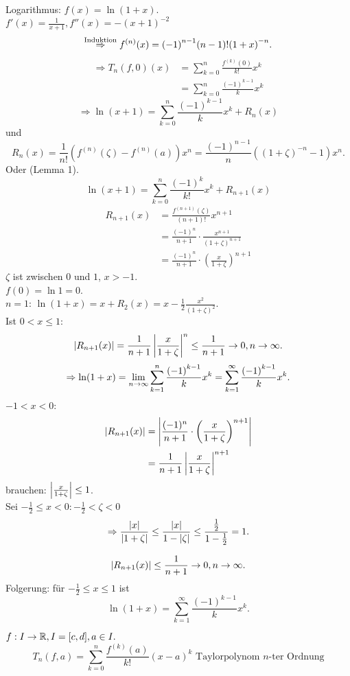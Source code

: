 \documentclass[../ana2.tex]{subfiles}
\begin{document}
\begin{bsp}
    Logarithmus: \( f(x) = \ln(1+x) \). \\
    \( f'(x) = \frac{1}{x+1}, f''(x) = -(x+1)^{-2} \)
    \[ \overset{\text{Induktion}}{\Rightarrow} f^{(n)}(x) 
    = {(-1)}^{n-1} (n-1)! {(1+x)}^{-n}. \]
    \begin{align*}
        \Rightarrow T_n(f,0)(x) &= \sum_{k=0}^{n} \frac{f^{(k)}(0)}{k!}x^k \\
        &= \sum_{k=0}^n \frac{{(-1)}^{k-1}}{k} x^k
    \end{align*}
    \[ \Rightarrow \ln(x+1) = \sum_{k=0}^n 
    \frac{ {(-1)}^{k-1} }{k} x^k + R_n(x) \]
    und 
    \[ R_n(x) = \frac{1}{n!} 
    \left(
        f^{(n)}(\zeta) - f^{(n)}(a)
    \right) x^n = \frac{{(-1)}^{n-1}}{n} 
    \left( (1 + \zeta)^{-n} - 1 \right) x^n. \]
    Oder (Lemma 1).
    \[ \ln(x+1) = \sum_{k=0}^{n} \frac{(-1)^k}{k!} x^k
    + R_{n+1}(x) \]   
    \begin{align*}
        R_{n+1}(x) &= \frac{f^{(n+1)}(\zeta)}{(n+1)!} x^{n+1} \\
        &= \frac{(-1)^n}{n+1} \cdot \frac{x^{n+1}}{(1+ \zeta)^{n+1}} \\
        &= \frac{(-1)^n}{n+1} 
        \cdot \left( \frac{x}{1+ \zeta} \right)^{n+1}
    \end{align*} 
    \( \zeta \) ist zwischen \(0\) und \(1\), \( x > -1 \).\\
    \( f(0) = \ln 1 = 0 \).\\
    \( n = 1 \): \( \ln(1+x) = x + R_2(x) 
    = x - \frac{1}{2} \frac{x^2}{(1+\zeta)^2} \).\\
    Ist \( 0 < x \leq 1 \): 
    \[ \left| R_{n+1}(x) \right| = \frac{1}{n+1} 
    \left|\frac{x}{1+\zeta}\right|^n \leq \frac{1}{n+1} \rightarrow 0, 
    n\rightarrow \infty. \]
    \[ \Rightarrow \ln(1+x) = \lim\limits_{n\rightarrow\infty} \sum_{k=1}^n 
    \frac{ {(-1)}^{k-1} }{ k } x^k 
    = \sum_{k=1}^\infty \frac{ {(-1)}^{k-1} }{k} x^k. \]
    \( -1 < x < 0 \):
    \begin{align*}
        \left| R_{n+1}(x) \right|
        &= \left| \frac{(-1)^n}{n+1} \cdot 
        \left( \frac{x}{1+\zeta} \right)^{n+1} \right| \\
        &= \frac{1}{n+1} \left|\frac{x}{1+\zeta}\right|^{n+1} 
    \end{align*}
    brauchen: \( \left|\frac{x}{1+\zeta}\right| \leq 1 \). \\
    Sei \( -\frac{1}{2} \leq x < 0: -\frac{1}{2} < \zeta < 0 \)    
    \[ \Rightarrow \frac{\left|x\right|}{\left|1+\zeta\right|} \leq \frac{\left|x\right|}{1-\left|\zeta\right|}
      \leq \frac{\frac{1}{2}}{1 - \frac{1}{2}} = 1. \]

    \[ \left| R_{n+1}(x) \right| \leq \frac{1}{n+1} 
    \rightarrow 0, n \rightarrow \infty. \]
    Folgerung: für \( -\frac{1}{2} \leq x \leq 1 \) ist 
    \[ \ln(1+x) = \sum_{k=1}^\infty 
    \frac{ {(-1)}^{k-1} }{k} x^k. \]
\end{bsp}
\( f:I\rightarrow \mathbb{R}, I = [c,d], a \in I. \)
\[ T_n(f,a) = \sum_{k=0}^n \frac{f^{(k)}(a)}{ k! } 
(x-a)^k \text{ Taylorpolynom } n\text{-ter Ordnung} \]
\end{document}

